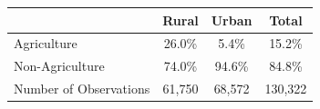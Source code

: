 \begin{tabular*}{0.7\textwidth}{@{\hskip\tabcolsep\extracolsep\fill}l*{3}{c}}
\toprule
            &       Rural&       Urban&       Total\\
\midrule
Agriculture &     26.0\%&      5.4\%&     15.2\%\\
Non-Agriculture&     74.0\%&     94.6\%&     84.8\%\\
Number of Observations&      61,750&      68,572&     130,322\\
\bottomrule
\end{tabular*}
